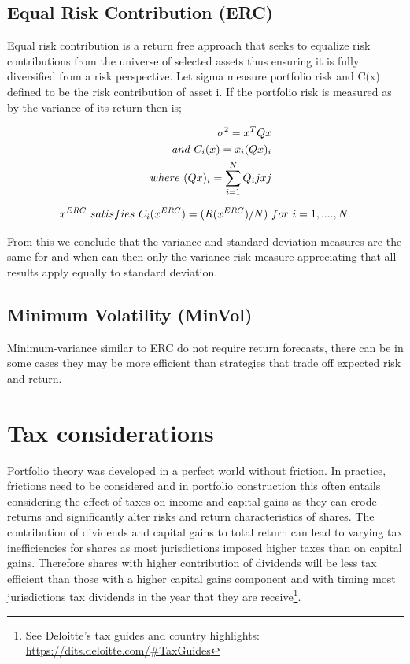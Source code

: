 \documentclass[12pt,preprint, authoryear]{elsarticle}
\numberwithin{equation}{section}
\numberwithin{figure}{section}
\numberwithin{table}{section}
\let\rmarkdownfootnote\footnote%
\def\footnote{\protect\rmarkdownfootnote}
\begin{document}
\hypertarget{equal-risk-contribution-erc}{%
\subsection{Equal Risk Contribution
(ERC)}\label{equal-risk-contribution-erc}}

Equal risk contribution is a return free approach that seeks to equalize
risk contributions from the universe of selected assets thus ensuring it
is fully diversified from a risk perspective. Let sigma measure
portfolio risk and C(x) defined to be the risk contribution of asset i.
If the portfolio risk is measured as by the variance of its return then
is;

\begin{align}
\sigma^2 = x^TQ{x}\\ and \ C_i(x)= x_i(Qx)_i \\ \notag
\quad where\ (Qx)_i =\sum_{i = 1}^{N}Q_ijxj \notag
\end{align}

\begin{align}
x^{ERC} \ satisfies \ C_i(x^{ERC}) = (R(x^{ERC})/N) \ for \ i = 1,...., N. \notag
\end{align}

From this we conclude that the variance and standard deviation measures
are the same for and when can then only the variance risk measure
appreciating that all results apply equally to standard deviation.

\hypertarget{minimum-volatility-minvol}{%
\subsection{Minimum Volatility
(MinVol)}\label{minimum-volatility-minvol}}

Minimum-variance similar to ERC do not require return forecasts, there
can be in some cases they may be more efficient than strategies that
trade off expected risk and return.

\hypertarget{tax-considerations}{%
\section{Tax considerations}\label{tax-considerations}}

Portfolio theory was developed in a perfect world without friction. In
practice, frictions need to be considered and in portfolio construction
this often entails considering the effect of taxes on income and capital
gains as they can erode returns and significantly alter risks and return
characteristics of shares. The contribution of dividends and capital
gains to total return can lead to varying tax inefficiencies for shares
as most jurisdictions imposed higher taxes than on capital gains.
Therefore shares with higher contribution of dividends will be less tax
efficient than those with a higher capital gains component and with
timing most jurisdictions tax dividends in the year that they are
receive\footnote{See Deloitte's tax guides and country highlights:
  \url{https://dits.deloitte.com/\#TaxGuides}}.
\end{document}
